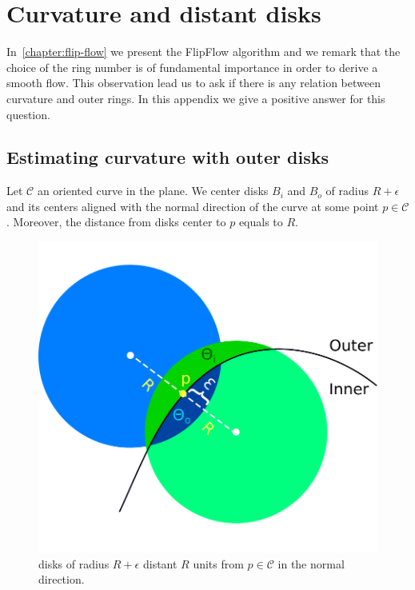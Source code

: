 \chapter{Curvature and distant disks}\label{app:curvature-and-distant-disks}

In~\cref{chapter:flip-flow} we present the FlipFlow algorithm and we remark that the choice of the ring number is of fundamental importance in order to derive a smooth flow. This observation lead us to ask if there is any relation between curvature and outer rings. In this appendix we give a positive answer for this question.

\section{Estimating curvature with outer disks}

Let $\mathcal{C}$ an oriented curve in the plane. We center disks $B_i$ and $B_o$ of radius $R + \epsilon$ and its centers aligned with the normal direction of the curve at some point $p \in \mathcal{C}$. Moreover, the distance from disks center to $p$ equals to $R$.

\begin{figure}
\center
\includegraphics[scale=0.35]{figures/appendix-max-energy/r-separated-disks.png}
\caption{disks of radius $R+\epsilon$ distant $R$ units from $p\in \mathcal{C}$ in the normal direction.}
\label{fig:r-separated-disks}
\end{figure}

